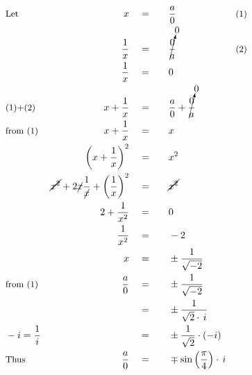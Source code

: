 \begin{alignat*}{5}
&\small\text{Let}&x\quad&=\quad&&\frac{a}{0}\qquad&\small\text{(1)}\\
&\,&\frac{1}{x}\quad&=&&\cancelto{0}{\frac{0}{a}}\qquad&\small\text{(2)}\\
&\,&\frac{1}{x}\quad&=&&0\\
&\small\text{(1)+(2)}&x+\frac{1}{x}\quad&=&&\frac{a}{0}+\cancelto{0}{\frac{0}{a}}\\
&\small\text{from (1)}&x+\frac{1}{x}\quad&=&&x\\
&\,&\left(x+\frac{1}{x}\right)^2\quad&=&&x^2\\
&\,&\cancel{x^2}+2\cancel{x}\frac{1}{\cancel{x}}+\left(\frac{1}{x}\right)^2\quad&=&&\cancel{x^2}\\
&\,&2+\frac{1}{x^2}\quad&=&&0\\
&\,&\frac{1}{x^2}\quad&=&&-2{}\\
&\,&x\quad&=&&\pm\frac{1}{\sqrt{-2}}\\
&\small\text{from (1)}&\frac{a}{0}\quad&=&&\pm\frac{1}{\sqrt{-2}}\\
&\,&\,&=&&\pm\frac{1}{\sqrt{2}\cdot\,i}\\
&\small -i=\frac{1}{i}&\,&=&&\pm\frac{1}{\sqrt{2}}\cdot(-i)\\
&\small\text{Thus}&\frac{a}{0}\quad&=&&\mp\sin{\left(\frac{\pi}{4}\right)}\cdot\,i
\end{alignat*}
